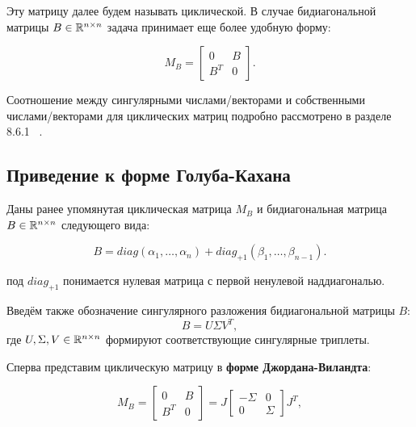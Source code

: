 Эту матрицу далее будем называть циклической. В случае бидиагональной матрицы \( B \in \mathbb{R}^{n \times n} \) задача принимает еще более удобную форму:

\begin{equation}
M_B = \begin{bmatrix} 0 & B \\ B^T & 0 \end{bmatrix}.
\end{equation}

Соотношение между сингулярными числами/векторами и собственными числами/векторами для циклических матриц подробно рассмотрено в разделе 8.6.1 ~\cite{Golub2013}. 


\subsection{Приведение к форме Голуба-Кахана}


Даны ранее упомянутая циклическая матрица \(M_B\) и бидиагональная матрица \(B \in \mathbb{R}^{n \times n}\) следующего вида:

\begin{equation}
    B= diag(\alpha_1,\dots,\alpha_n)+diag_{+1}(\beta_1,\dots,\beta_{n-1}).
\end{equation}

\begin{note}
    под \(diag_{+1}\) понимается нулевая матрица с первой ненулевой наддиагональю.
\end{note}

\begin{note}
    Введём также обозначение сингулярного разложения бидиагональной матрицы \(B\):
    \[
    B=U\Sigma V^T,
    \]
    где \(U,\Sigma,V \in \mathbb{R}^{n \times n}\) формируют соответствующие сингулярные триплеты.
\end{note}
Сперва представим циклическую матрицу в \textbf{форме Джордана-Виландта}:

\begin{equation}
    M_B= \begin{bmatrix}
        0 & B \\
        B^T & 0
    \end{bmatrix} = J
    \begin{bmatrix}
        -\Sigma & 0 \\
        0 & \Sigma
    \end{bmatrix} J^T,
\end{equation}


